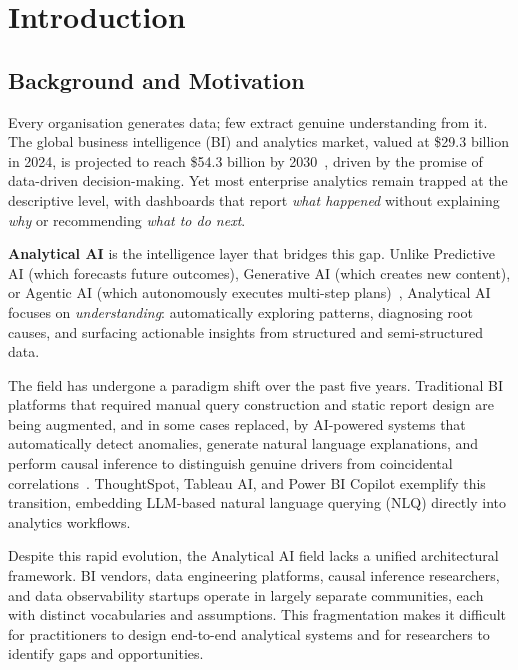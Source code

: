 \documentclass[12pt, a4paper]{article}
\begin{document}
\section{Introduction}\label{sec:intro}

\subsection{Background and Motivation}
Every organisation generates data; few extract genuine understanding from it. The global business intelligence (BI) and analytics market, valued at \$29.3 billion in 2024, is projected to reach \$54.3 billion by 2030~\citep{grandview2025bi}, driven by the promise of data-driven decision-making. Yet most enterprise analytics remain trapped at the descriptive level, with dashboards that report \emph{what happened} without explaining \emph{why} or recommending \emph{what to do next}.

\textbf{Analytical AI} is the intelligence layer that bridges this gap. Unlike Predictive AI (which forecasts future outcomes), Generative AI (which creates new content), or Agentic AI (which autonomously executes multi-step plans)~\citep{mahdi2026taxonomy}, Analytical AI focuses on \emph{understanding}: automatically exploring patterns, diagnosing root causes, and surfacing actionable insights from structured and semi-structured data.

The field has undergone a paradigm shift over the past five years. Traditional BI platforms that required manual query construction and static report design are being augmented, and in some cases replaced, by AI-powered systems that automatically detect anomalies, generate natural language explanations, and perform causal inference to distinguish genuine drivers from coincidental correlations~\citep{gartner2024augmented}. ThoughtSpot, Tableau AI, and Power BI Copilot exemplify this transition, embedding LLM-based natural language querying (NLQ) directly into analytics workflows.

Despite this rapid evolution, the Analytical AI field lacks a unified architectural framework. BI vendors, data engineering platforms, causal inference researchers, and data observability startups operate in largely separate communities, each with distinct vocabularies and assumptions. This fragmentation makes it difficult for practitioners to design end-to-end analytical systems and for researchers to identify gaps and opportunities.
\end{document}
